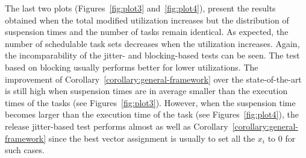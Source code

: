 The last two plots (Figures~\ref{fig:plot3} and~\ref{fig:plot4}), present the results obtained when the total modified utilization increases but the distribution of suspension times and the number of tasks remain identical. As expected, the number of schedulable task sets decreases when the utilization increases. Again, the incomparability of the jitter- and blocking-based tests can be seen. The test based on blocking usually performs better for lower utilizations. The improvement of Corollary~\ref{corollary:general-framework} over the state-of-the-art is still high when suspension times are in average smaller than the execution times of the tasks (see Figures~\ref{fig:plot3}). However, when the suspension time becomes larger than the execution time of the task (see Figures~\ref{fig:plot4}), the release jitter-based test performs almost as well as Corollary~\ref{corollary:general-framework} since the best vector assignment is usually to set all the $x_i$ to $0$ for such cases.
